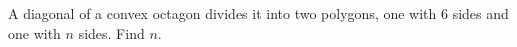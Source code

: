 A diagonal of a convex octagon divides it into two polygons, one with $6$ sides and one with $n$ sides. Find $n$.
